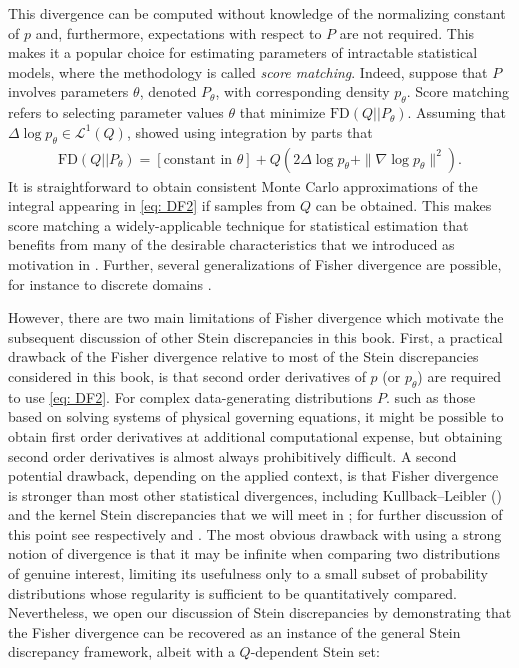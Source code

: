 \documentclass[12pt,paper=letter]{scrreprt}
\begin{document}
\noindent This divergence can be computed without knowledge of the normalizing constant of $p$ and, furthermore, expectations with respect to $P$ are not required.
This makes it a popular choice for estimating parameters of intractable statistical models, where the methodology is called \emph{score matching}. 
Indeed, suppose that $P$ involves parameters $\theta$, denoted $P_\theta$, with corresponding density $p_\theta$. 
Score matching refers to selecting parameter values $\theta$ that minimize $\mathrm{FD}(Q||P_\theta)$.
Assuming that $\Delta \log p_\theta \in \mathcal{L}^1(Q)$, \citet{hyvarinen2005estimation} showed using integration by parts that
\begin{align}
    \mathrm{FD}(Q||P_\theta) = [\text{constant in $\theta$}] + Q( 2 \Delta \log p_\theta + \|\nabla \log p_\theta\|^2 ) . \label{eq: DF2} 
\end{align}
It is straightforward to obtain consistent Monte Carlo approximations of the integral appearing in \eqref{eq: DF2} if samples from $Q$ can be obtained.
This makes score matching a widely-applicable technique for statistical estimation that benefits from many of the desirable characteristics that we introduced as motivation in .
Further, several generalizations of Fisher divergence are possible, for instance to discrete domains \citep{matsubara2023generalized}.

However, there are two main limitations of Fisher divergence which motivate the subsequent discussion of other Stein discrepancies in this book.
First, a practical drawback of the Fisher divergence relative to most of the Stein discrepancies considered in this book, is that second order derivatives of $p$ (or $p_\theta$) are required to use \eqref{eq: DF2}.
For complex data-generating distributions $P$. such as those based on solving systems of physical governing equations, it might be possible to obtain first order derivatives at additional computational expense, but obtaining second order derivatives is almost always prohibitively difficult.
A second potential drawback, depending on the applied context, is that Fisher divergence is stronger than most other statistical divergences, including Kullback--Leibler () and the kernel Stein discrepancies that we will meet in ; for further discussion of this point see respectively \citet{ley2013stein} and \citet[][Thm~5.1]{Liu2016}.
The most obvious drawback with using a strong notion of divergence is that it may be infinite when comparing two distributions of genuine interest, limiting its usefulness only to a small subset of probability distributions whose regularity is sufficient to be quantitatively compared.
Nevertheless, we open our discussion of Stein discrepancies by demonstrating that the Fisher divergence can be recovered as an instance of the general Stein discrepancy framework, albeit with a $Q$-dependent Stein set:
\end{document}
